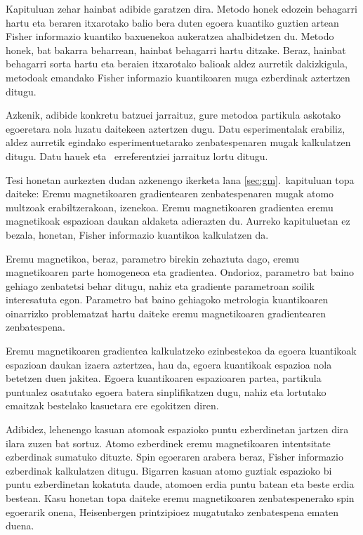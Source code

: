 Kapituluan zehar hainbat adibide garatzen dira.
Metodo honek edozein behagarri hartu eta beraren itxarotako balio bera duten egoera kuantiko guztien artean Fisher informazio kuantiko baxuenekoa aukeratzea ahalbidetzen du.
Metodo honek, bat bakarra beharrean, hainbat behagarri hartu ditzake.
Beraz, hainbat behagarri sorta hartu eta beraien itxarotako balioak aldez aurretik dakizkigula, metodoak emandako Fisher informazio kuantikoaren muga ezberdinak aztertzen ditugu.

Azkenik, adibide konkretu batzuei jarraituz, gure metodoa partikula askotako egoeretara nola luzatu daitekeen aztertzen dugu.
Datu esperimentalak erabiliz, aldez aurretik egindako esperimentuetarako zenbatespenaren mugak kalkulatzen ditugu.
Datu hauek \cite{Luecke2014} eta \cite{Gross2010}~erreferentziei jarraituz lortu ditugu.

Tesi honetan aurkezten dudan azkenengo ikerketa lana \ref{sec:gm}.~kapituluan topa daiteke: Eremu magnetikoaren gradientearen zenbatespenaren mugak atomo multzoak erabiltzerakoan, izenekoa.
Eremu magnetikoaren gradientea eremu magnetikoak espazioan daukan aldaketa adierazten du.
Aurreko kapituluetan ez bezala, honetan, Fisher informazio kuantikoa kalkulatzen da.

Eremu magnetikoa, beraz, parametro birekin zehaztuta dago, eremu magnetikoaren parte homogeneoa eta gradientea.
Ondorioz, parametro bat baino gehiago zenbatetsi behar ditugu, nahiz eta gradiente parametroan soilik interesatuta egon.
Parametro bat baino gehiagoko metrologia kuantikoaren oinarrizko problematzat hartu daiteke eremu magnetikoaren gradientearen zenbatespena.

Eremu magnetikoaren gradientea kalkulatzeko ezinbestekoa da egoera kuantikoak espazioan daukan izaera aztertzea, hau da, egoera kuantikoak espazioa nola betetzen duen jakitea.
Egoera kuantikoaren espazioaren partea, partikula puntualez osatutako egoera batera sinplifikatzen dugu, nahiz eta lortutako emaitzak bestelako kasuetara ere egokitzen diren.

Adibidez, lehenengo kasuan atomoak espazioko puntu ezberdinetan jartzen dira ilara zuzen bat sortuz.
Atomo ezberdinek eremu magnetikoaren intentsitate ezberdinak sumatuko dituzte.
Spin egoeraren arabera beraz, Fisher informazio ezberdinak kalkulatzen ditugu.
Bigarren kasuan atomo guztiak espazioko bi puntu ezberdinetan kokatuta daude, atomoen erdia puntu batean eta beste erdia bestean.
Kasu honetan topa daiteke eremu magnetikoaren zenbatespenerako spin egoerarik onena, Heisenbergen printzipioez mugatutako zenbatespena ematen duena.

